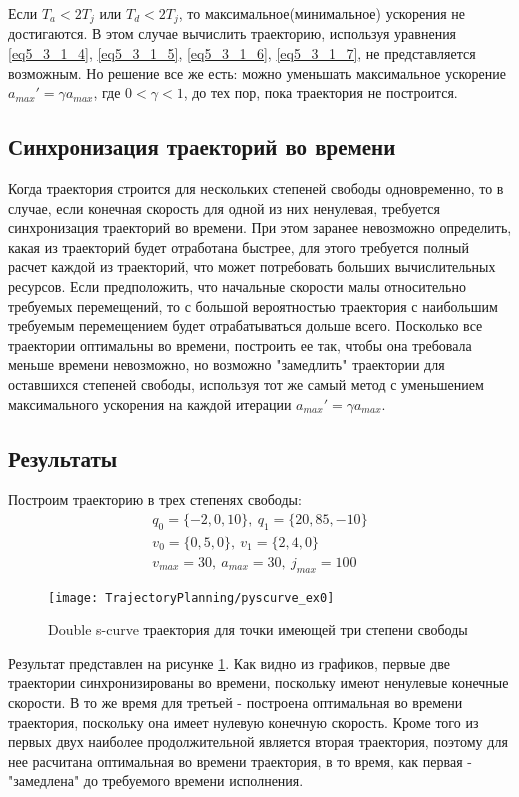 	Если $T_{a} < 2T_{j}$ или $T_{d} < 2T_{j}$, то максимальное(минимальное) ускорения не достигаются. В этом случае вычислить траекторию, используя уравнения \ref{eq5_3_1_4}, \ref{eq5_3_1_5}, \ref{eq5_3_1_6}, \ref{eq5_3_1_7}, не представляется возможным. Но решение все же есть: можно уменьшать максимальное ускорение $a_{max}' = \gamma a_{max}$, где $0 < \gamma < 1$, до тех пор, пока траектория не построится.
	
\subsection{Синхронизация траекторий во времени} \label{subsect5_3_2}
Когда траектория строится для нескольких степеней свободы одновременно, то в случае, если конечная скорость для одной из них ненулевая, требуется синхронизация траекторий во времени. При этом заранее невозможно определить, какая из траекторий будет отработана быстрее, для этого требуется полный расчет каждой из траекторий, что может потребовать больших вычислительных ресурсов. Если предположить, что начальные скорости малы относительно требуемых перемещений, то с большой вероятностью траектория с наибольшим требуемым перемещением будет отрабатываться дольше всего. Посколько все траектории оптимальны во времени, построить ее так, чтобы она требовала меньше времени невозможно, но возможно "замедлить" траектории для оставшихся степеней свободы, используя тот же самый метод с уменьшением максимального ускорения на каждой итерации $a_{max}' = \gamma a_{max}$.

\subsection{Результаты} \label{subsect5_3_3}
Построим траекторию в трех степенях свободы:
\begin{align*}
	q_{0} = \{-2, 0, 10\},\ q_{1} = \{20, 85, -10\}\\
	v_{0} = \{0, 5, 0\},\ v_{1} = \{2, 4, 0\}\\
	v_{max} = 30,\ a_{max} = 30,\ j_{max} = 100
\end{align*} 

\begin{figure}[ht]
	\centering
	\texttt{[image: TrajectoryPlanning/pyscurve\_ex0]}
	\caption{Double s-curve траектория для точки имеющей три степени свободы}
	\label{fig:pyscurve_ex0}
\end{figure}

Результат представлен на рисунке \ref{fig:pyscurve_ex0}.
Как видно из графиков, первые две траектории синхронизированы во времени, поскольку имеют ненулевые конечные скорости. В то же время для третьей - построена оптимальная во времени траектория, поскольку она имеет нулевую конечную скорость. Кроме того из первых двух наиболее продолжительной является вторая траектория, поэтому для нее расчитана оптимальная во времени траектория, в то время, как первая - "замедлена" до требуемого времени исполнения.